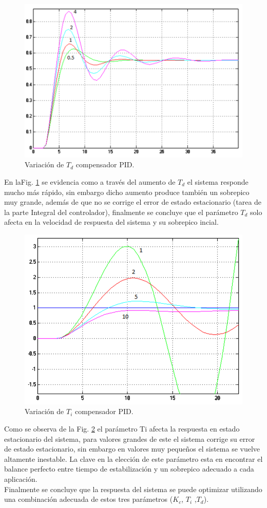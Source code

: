 \documentclass[twocolumn]{IEEEtran}
\begin{document}
\begin{figure}[H]
	\centering
		\includegraphics[scale=0.27]{tdvariacion.png}
	\caption{Variación de $T_d$ compensador PID.}
	\label{fig18}
\end{figure}
\noindent
En laFig. \ref{fig18} se evidencia como a través del aumento de $T_d$ el sistema responde mucho más rápido, sin embargo dicho aumento produce también un sobrepico muy grande, además de que no se corrige el error de estado estacionario (tarea de la parte Integral del controlador), finalmente se concluye que el parámetro $T_d$ solo afecta en la velocidad de respuesta del sistema y su sobrepico incial.
\begin{figure}[H]
	\centering
		\includegraphics[scale=0.27]{tivariacion.png}
	\caption{Variación de $T_i$ compensador PID.}
	\label{fig19}
\end{figure}
\noindent
Como se observa de la Fig. \ref{fig19} el parámetro Ti afecta la respuesta en estado estacionario del sistema, para valores grandes de este el sistema corrige su error de estado estacionario, sin embargo en valores muy pequeños el sistema se vuelve altamente inestable. La clave en la elección de este parámetro esta en encontrar el balance perfecto entre tiempo de estabilización y un sobrepico adecuado a cada aplicación.\\
Finalmente se concluye que la respuesta del sistema se puede optimizar utilizando una combinación adecuada de estos tres parámetros ($K_c$, $T_i$ ,$T_d$).
\end{document}
